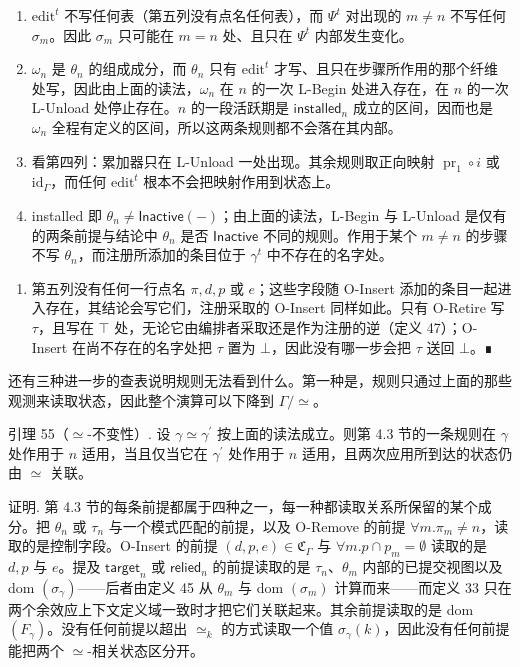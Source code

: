 \begin{enumerate}
\def\labelenumi{(\arabic{enumi})}
\item
  $\mathrm{edit}^{t}$ 不写任何表（第五列没有点名任何表），而 $\Psi ^ { t }$ 对出现的 $m \neq n$ 不写任何 $\sigma _ { m }$。因此 $\sigma _ { m }$ 只可能在 $m = n$ 处、且只在 $\Psi ^ { t }$ 内部发生变化。
\item
  $\omega _ { n }$ 是 $\theta _ { n }$ 的组成成分，而 $\theta _ { n }$ 只有 $\mathrm{edit}^{t}$ 才写、且只在步骤所作用的那个纤维处写，因此由上面的读法，$\omega _ { n }$ 在 $n$ 的一次 L-Begin 处进入存在，在 $n$ 的一次 L-Unload 处停止存在。$n$ 的一段活跃期是 $\mathsf{installed}_{n}$ 成立的区间，因而也是 $\omega _ { n }$ 全程有定义的区间，所以这两条规则都不会落在其内部。
\item
  看第四列：累加器只在 L-Unload 一处出现。其余规则取正向映射 $\operatorname { p r } _ { 1 } \circ i$ 或 $\mathrm { i d } _ { \Gamma }$，而任何 $\mathrm{edit}^{t}$ 根本不会把映射作用到状态上。
\item
  installed 即 $\theta _ { n } \neq \mathsf { I n a c t i v e } ( - )$；由上面的读法，L-Begin 与 L-Unload 是仅有的两条前提与结论中 $\theta _ { n }$ 是否 $\mathsf{Inactive}$ 不同的规则。作用于某个 $m \neq n$ 的步骤不写 $\theta _ { n }$，而注册所添加的条目位于 $\gamma ^ { t }$ 中不存在的名字处。
\end{enumerate}

\begin{enumerate}
\def\labelenumi{(\arabic{enumi})}
\setcounter{enumi}{4}
\tightlist
\item
  第五列没有任何一行点名 $\pi , d , p$ 或 $e$；这些字段随 O-Insert 添加的条目一起进入存在，其结论会写它们，注册采取的 O-Insert 同样如此。只有 O-Retire 写 $\tau$，且写在 $\top$ 处，无论它由编排者采取还是作为注册的逆（定义 47）；O-Insert 在尚不存在的名字处把 $\tau$ 置为 $\bot$，因此没有哪一步会把 $\tau$ 送回 $\bot$。∎
\end{enumerate}

还有三种进一步的查表说明规则无法看到什么。第一种是，规则只通过上面的那些观测来读取状态，因此整个演算可以下降到 $\Gamma / \simeq$。

引理 55（$\simeq$-不变性）. 设 $\gamma \simeq \gamma ^ { \prime }$ 按上面的读法成立。则第 4.3 节的一条规则在 $\gamma$ 处作用于 $n$ 适用，当且仅当它在 $\gamma ^ { \prime }$ 处作用于 $n$ 适用，且两次应用所到达的状态仍由 $\simeq$ 关联。

证明. 第 4.3 节的每条前提都属于四种之一，每一种都读取关系所保留的某个成分。把 $\theta _ { n }$ 或 $\tau _ { n }$ 与一个模式匹配的前提，以及 O-Remove 的前提 $\forall m. \pi _ { m } \neq n$，读取的是控制字段。O-Insert 的前提 $( d , p , e ) \in \mathfrak { C } _ { \Gamma }$ 与 $\forall m. p \cap p _ { m } = \emptyset$ 读取的是 $d , p$ 与 $e$。提及 $\mathsf{target}_{n}$ 或 $\mathsf{relied}_{n}$ 的前提读取的是 $\tau _ { n }$、$\theta _ { m }$ 内部的已提交视图以及 dom $\left( \sigma _ { \gamma } \right)$——后者由定义 45 从 $\theta _ { m }$ 与 dom $( \sigma _ { m } )$ 计算而来——而定义 33 只在两个余效应上下文定义域一致时才把它们关联起来。其余前提读取的是 dom $\left( F _ { \gamma } \right)$。没有任何前提以超出 $\simeq_{k}$ 的方式读取一个值 $\sigma _ { \gamma } ( k )$，因此没有任何前提能把两个 $\simeq$-相关状态区分开。

